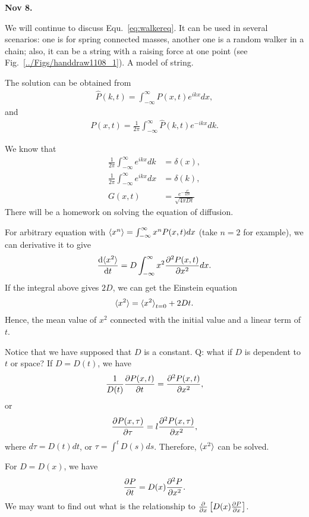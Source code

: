\textbf{Nov 8.}

We will continue to discuss Equ.~\ref{eq:walkereq}. It can be used in several scenarios: one is for spring connected masses, another one is a random walker in a chain; also, it can be a string with a raising force at one point (see Fig.~\ref{../Figs/handdraw1108_1}). 
 {A model of string.}

The solution can be obtained from
\begin{align}
\hat{P}(k,t)=\int_{-\infty}^\infty P(x,t)e^{ikx} dx,
\end{align}
and 
\begin{align}
P(x,t) = \frac{1}{2\pi} \int_{-\infty}^\infty \hat{P}(k,t)e^{-ikx} dk.
\end{align}

We know that 
\begin{align}
\frac{1}{2\pi} \int_{-\infty}^\infty e^{ikx} dk &= \delta(x),\\
\frac{1}{2\pi} \int_{-\infty}^\infty e^{ikx} dx &= \delta(k),\\
G(x,t) &= \frac{e^{-\frac{x^2}{4Dt}}}{\sqrt{4\pi Dt}}
\end{align}
There will be a homework on solving the equation of diffusion. 

For arbitrary equation with $\mathinner{\langle{x^n}\rangle}=\int_{-\infty}^\infty x^n P(x,t) dx  $ (take $ n=2 $ for example), we can derivative it to give
\begin{align}
\frac{{\mathrm d} {\mathinner{\langle{x^2}\rangle}}}{{\mathrm d}t} = D \int_{-\infty}^\infty x^2 \frac{\partial^2 {P(x,t)}}{\partial {x}^2} dx . 
\end{align}
If the integral above gives $ 2D $, we can get the Einstein equation
\begin{align}
\mathinner{\langle{x^2}\rangle} = \mathinner{\langle{x^2}\rangle}_{t=0} + 2Dt.
\end{align}
Hence, the mean value of $ x^2 $ connected with the initial value and a linear term of $ t $. 

Notice that we have supposed that $ D $ is a constant. Q: what if $ D $ is dependent to $ t $ or space? If $ D=D(t) $, we have
\begin{align}
\frac{1}{D(t)} \frac{\partial {P(x,t)}}{\partial t} = \frac{\partial^2 {P(x,t)}}{\partial {x}^2},
\end{align}
or 
\begin{align}
\frac{\partial {P(x,\tau)}}{\partial {\tau}} = l \frac{\partial^2 {P(x,\tau)}}{\partial {x}^2},
\end{align}
where $ d\tau = D(t)dt $, or $ \tau = \int^t D(s) ds $. Therefore, $ \mathinner{\langle{x^2}\rangle} $ can be solved. 

For $ D=D(x) $, we have
\begin{align}
\frac{\partial {P}}{\partial t} = D(x) \frac{\partial^2 {P}}{\partial {x}^2}.
\end{align}
We may want to find out what is the relationship to $ \frac{\partial}{\partial x} \left[ D(x) \frac{\partial {P}}{\partial {x}} \right] $. 

